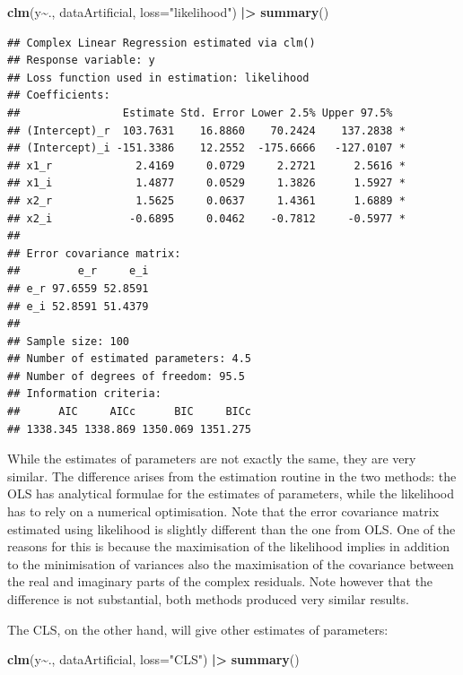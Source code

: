 \documentclass[
]{book}
\newenvironment{Shaded}{\begin{snugshade}}{\end{snugshade}}
\newcommand{\DataTypeTok}[1]{\textcolor[rgb]{0.13,0.29,0.53}{#1}}
\newcommand{\ErrorTok}[1]{\textcolor[rgb]{0.64,0.00,0.00}{\textbf{#1}}}
\newcommand{\KeywordTok}[1]{\textcolor[rgb]{0.13,0.29,0.53}{\textbf{#1}}}
\newcommand{\NormalTok}[1]{#1}
\newcommand{\OperatorTok}[1]{\textcolor[rgb]{0.81,0.36,0.00}{\textbf{#1}}}
\newcommand{\StringTok}[1]{\textcolor[rgb]{0.31,0.60,0.02}{#1}}
\begin{document}
\begin{Shaded}
\begin{Highlighting}[]
\KeywordTok{clm}\NormalTok{(y}\OperatorTok{\textasciitilde{}}\NormalTok{., dataArtificial, }\DataTypeTok{loss=}\StringTok{"likelihood"}\NormalTok{) }\OperatorTok{|}\ErrorTok{\textgreater{}}
\StringTok{    }\KeywordTok{summary}\NormalTok{()}
\end{Highlighting}
\end{Shaded}

\begin{verbatim}
## Complex Linear Regression estimated via clm()
## Response variable: y
## Loss function used in estimation: likelihood
## Coefficients:
##                Estimate Std. Error Lower 2.5% Upper 97.5%  
## (Intercept)_r  103.7631    16.8860    70.2424    137.2838 *
## (Intercept)_i -151.3386    12.2552  -175.6666   -127.0107 *
## x1_r             2.4169     0.0729     2.2721      2.5616 *
## x1_i             1.4877     0.0529     1.3826      1.5927 *
## x2_r             1.5625     0.0637     1.4361      1.6889 *
## x2_i            -0.6895     0.0462    -0.7812     -0.5977 *
## 
## Error covariance matrix:
##         e_r     e_i
## e_r 97.6559 52.8591
## e_i 52.8591 51.4379
## 
## Sample size: 100
## Number of estimated parameters: 4.5
## Number of degrees of freedom: 95.5
## Information criteria:
##      AIC     AICc      BIC     BICc 
## 1338.345 1338.869 1350.069 1351.275
\end{verbatim}

While the estimates of parameters are not exactly the same, they are very similar. The difference arises from the estimation routine in the two methods: the OLS has analytical formulae for the estimates of parameters, while the likelihood has to rely on a numerical optimisation. Note that the error covariance matrix estimated using likelihood is slightly different than the one from OLS. One of the reasons for this is because the maximisation of the likelihood implies in addition to the minimisation of variances also the maximisation of the covariance between the real and imaginary parts of the complex residuals. Note however that the difference is not substantial, both methods produced very similar results.

The CLS, on the other hand, will give other estimates of parameters:

\begin{Shaded}
\begin{Highlighting}[]
\KeywordTok{clm}\NormalTok{(y}\OperatorTok{\textasciitilde{}}\NormalTok{., dataArtificial, }\DataTypeTok{loss=}\StringTok{"CLS"}\NormalTok{) }\OperatorTok{|}\ErrorTok{\textgreater{}}
\StringTok{    }\KeywordTok{summary}\NormalTok{()}
\end{Highlighting}
\end{Shaded}
\end{document}
